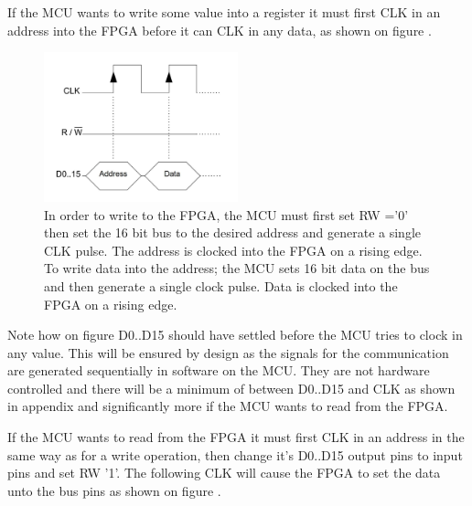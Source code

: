 If the MCU wants to write some value into a register it must first CLK in an address into the FPGA before it can CLK in any data, as shown on figure . 
\begin{figure}[H]
    \centering
    \includegraphics[clip, trim=0 50 0 0, width=0.5\textwidth]{Sections/7_SystemDesign/Figures/7_2_1_CommWrite.pdf}
    \caption{In order to write to the FPGA, the MCU must first set RW ='0' then set the 16 bit bus to the desired address and generate a single CLK pulse. The address is clocked into the FPGA on a rising edge. To write data into the address; the MCU sets 16 bit data on the bus and then generate a single clock pulse. Data is clocked into the FPGA on a rising edge.}
    \label{fig_7_2_1_CommWrite}
\end{figure}

Note how on figure  D0..D15 should have settled before the MCU tries to clock in any value. This will be ensured by design as the signals for the communication are generated sequentially in software on the MCU. They are not hardware controlled and there will be a minimum of  between D0..D15 and CLK as shown in appendix  and significantly more if the MCU wants to read from the FPGA.

If the MCU wants to read from the FPGA it must first CLK in an address in the same way as for a write operation, then change it's D0..D15 output pins to input pins and set RW '1'. The following CLK will cause the FPGA to set the data unto the bus pins as shown on figure . 

